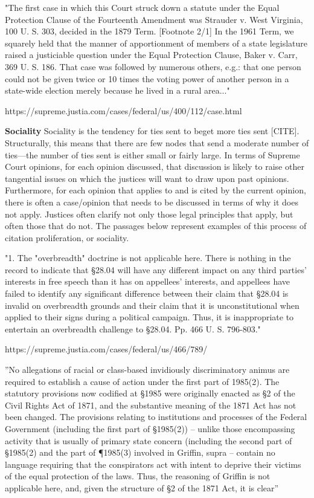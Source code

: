 \documentclass[headsepline=true, abstracton]{scrartcl}
\begin{document}
"The first case in which this Court struck down a statute under the Equal Protection Clause of the Fourteenth Amendment was Strauder v. West Virginia, 100 U. S. 303, decided in the 1879 Term. [Footnote 2/1] In the 1961 Term, we squarely held that the manner of apportionment of members of a state legislature raised a justiciable question under the Equal Protection Clause, Baker v. Carr, 369 U. S. 186. That case was followed by numerous others, e.g.: that one person could not be given twice or 10 times the voting power of another person in a state-wide election merely because he lived in a rural area..."

https://supreme.justia.com/cases/federal/us/400/112/case.html

\textbf{Sociality} Sociality is the tendency for ties sent to beget more ties sent [CITE]. Structurally, this means that there are few nodes that send a moderate number of ties---the number of ties sent is either small or fairly large. In terms of Supreme Court opinions,  for each opinion discussed, that discussion is likely to raise other tangential issues on which the justices will want to draw upon past opinions.  Furthermore, for each opinion that applies to and is cited by the current opinion, there is often a case/opinion that needs to be discussed in terms of why it does not apply. Justices often clarify not only those legal principles that apply, but often those that do not. The passages below represent examples of this process of citation proliferation, or sociality.

"1. The "overbreadth" doctrine is not applicable here. There is nothing in the record to indicate that \S 28.04 will have any different impact on any third parties' interests in free speech than it has on appellees' interests, and appellees have failed to identify any significant difference between their claim that \S 28.04 is invalid on overbreadth grounds and their claim that it is unconstitutional when applied to their signs during a political campaign. Thus, it is inappropriate to entertain an overbreadth challenge to \S 28.04. Pp. 466 U. S. 796-803."

https://supreme.justia.com/cases/federal/us/466/789/

''No allegations of racial or class-based invidiously discriminatory animus are required to establish a cause of action under the first part of  1985(2). The statutory provisions now codified at \S 1985 were originally enacted as \S 2 of the Civil Rights Act of 1871, and the substantive meaning of the 1871 Act has not been changed. The provisions relating to institutions and processes of the Federal Government (including the first part of \S 1985(2)) -- unlike those encompassing activity that is usually of primary state concern (including the second part of \S 1985(2) and the part of \P 1985(3) involved in Griffin, supra -- contain no language requiring that the conspirators act with intent to deprive their victims of the equal protection of the laws. Thus, the reasoning of Griffin is not applicable here, and, given the structure of \S 2 of the 1871 Act, it is clear''
\end{document}
